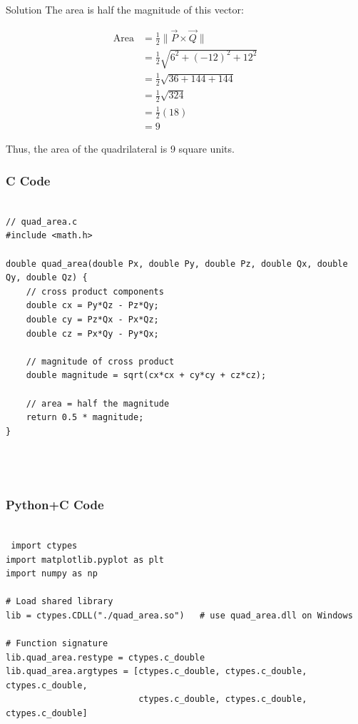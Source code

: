 \documentclass{beamer}
\begin{document}
\begin{frame}{Solution}
The area is half the magnitude of this vector:  

\begin{align*}
\text{Area} &= \tfrac{1}{2} \|\vec{P} \times \vec{Q}\| \\
&= \tfrac{1}{2} \sqrt{6^2 + (-12)^2 + 12^2} \\
&= \tfrac{1}{2} \sqrt{36 + 144 + 144} \\
&= \tfrac{1}{2} \sqrt{324} \\
&= \tfrac{1}{2}(18) \\
&= 9
\end{align*}

Thus, the area of the quadrilateral is 9 square units.

\end{frame}



\begin{frame}[fragile]
    \frametitle{C Code}

    \begin{lstlisting}

// quad_area.c
#include <math.h>

double quad_area(double Px, double Py, double Pz, double Qx, double Qy, double Qz) {
    // cross product components
    double cx = Py*Qz - Pz*Qy;
    double cy = Pz*Qx - Px*Qz;
    double cz = Px*Qy - Py*Qx;

    // magnitude of cross product
    double magnitude = sqrt(cx*cx + cy*cy + cz*cz);

    // area = half the magnitude
    return 0.5 * magnitude;
}


    

    \end{lstlisting}
\end{frame}



\begin{frame}[fragile]
    \frametitle{Python+C Code}
    \begin{lstlisting}
    
 import ctypes
import matplotlib.pyplot as plt
import numpy as np

# Load shared library
lib = ctypes.CDLL("./quad_area.so")   # use quad_area.dll on Windows

# Function signature
lib.quad_area.restype = ctypes.c_double
lib.quad_area.argtypes = [ctypes.c_double, ctypes.c_double, ctypes.c_double,
                          ctypes.c_double, ctypes.c_double, ctypes.c_double]





    \end{lstlisting}
\end{frame}
\end{document}
